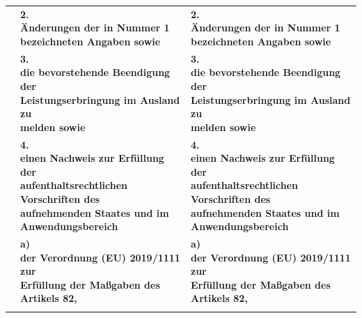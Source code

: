 \documentclass[10pt,a4paper,landscape]{article}
\begin{document}
\begin{longtable}{|L{8.2cm}|L{8.2cm}|L{8.2cm}|}
\hhline{|---|}
 & \textbf{2.   \newline Änderungen der in Nummer 1  \newline bezeichneten Angaben sowie } & \textbf{2.   \newline Änderungen der in Nummer 1  \newline bezeichneten Angaben sowie } \\
\hhline{|---|}
 & \textbf{3.   \newline die bevorstehende Beendigung der  \newline Leistungserbringung im Ausland zu  \newline melden sowie } & \textbf{3.   \newline die bevorstehende Beendigung der  \newline Leistungserbringung im Ausland zu  \newline melden sowie } \\
\hhline{|---|}
 & \textbf{4.   \newline einen Nachweis zur Erfüllung der  \newline aufenthaltsrechtlichen Vorschriften des  \newline aufnehmenden Staates und im  \newline Anwendungsbereich } & \textbf{4.   \newline einen Nachweis zur Erfüllung der  \newline aufenthaltsrechtlichen Vorschriften des  \newline aufnehmenden Staates und im  \newline Anwendungsbereich } \\
\hhline{|---|}
 & \textbf{a)   \newline der Verordnung (EU) 2019/1111 zur  \newline Erfüllung der Maßgaben des Artikels 82, } & \textbf{a)   \newline der Verordnung (EU) 2019/1111 zur  \newline Erfüllung der Maßgaben des Artikels 82, } \\
\hhline{|---|}

\end{longtable}
\end{document}
